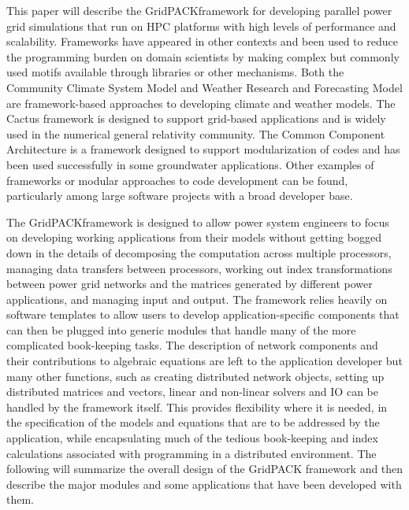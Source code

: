 \documentclass[preprint]{acm_proc_article-sp}
\begin{document}
This paper will describe the GridPACK\texttrademark framework for developing parallel
power grid simulations that run on HPC platforms with high levels of
performance and scalability. Frameworks have appeared in other contexts and been
used to reduce the programming burden on domain scientists by making complex
but commonly used motifs available through libraries or other mechanisms.
Both the Community Climate System Model\cite{CCSM} and Weather Research
and Forecasting Model\cite{WRF} are framework-based
approaches to developing climate and weather models. The Cactus framework is
designed to support grid-based applications and is widely used in the numerical
general relativity community\cite{CACTUS}. The Common Component
Architecture\cite{CCA} is a framework
designed to support modularization of codes and has been used successfully in
some groundwater applications\cite{SPH}. Other examples of frameworks or modular approaches
to code development can be found, particularly among large software projects
with a broad developer base.

The GridPACK\texttrademark framework is designed to allow power
system engineers to focus on developing working applications from their
models without getting bogged down in the details of decomposing the computation
across multiple processors, managing data transfers between processors, working out
index transformations between power grid networks and the matrices generated by
different power applications, and managing input and output. The framework
relies heavily on software templates to allow users to develop
application-specific components that can then be plugged into generic modules
that handle many of the more complicated book-keeping tasks. The description of
network components and their contributions to algebraic equations are left to
the application developer but many other functions, such as creating distributed
network objects, setting up distributed matrices and vectors, linear and
non-linear solvers and IO can be handled by the framework itself. This provides
flexibility where it is needed, in the specification of the models and equations
that are to be addressed by the application, while encapsulating much of the
tedious book-keeping and index calculations associated with programming in a
distributed environment.
The following will summarize the overall design of the GridPACK\texttrademark
framework and then describe the major modules and some applications that have
been developed with them.
\end{document}
